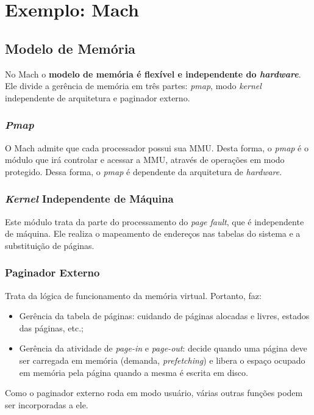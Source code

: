 \section{Exemplo: Mach}

\subsection{Modelo de Memória}
No Mach o \textbf{modelo de memória é flexível e independente do \textit{hardware}}. Ele divide a gerência de memória em três partes: \textit{pmap}, modo \textit{kernel} independente de arquitetura e paginador externo.

\subsubsection{\textit{Pmap}}
O Mach admite que cada processador possui sua MMU. Desta forma, o \textit{pmap} é o módulo que irá controlar e acessar a MMU, através de operações em modo protegido. Dessa forma, o \textit{pmap} é dependente da arquitetura de \textit{hardware}.

\subsubsection{\textit{Kernel} Independente de Máquina}
Este módulo trata da parte do processamento do \textit{page fault}, que é independente de máquina. Ele realiza o mapeamento de endereços nas tabelas do sistema e a substituição de páginas.

\subsubsection{Paginador Externo}
Trata da lógica de funcionamento da memória virtual. Portanto, faz:
\begin{itemize}
  \item Gerência da tabela de páginas: cuidando de páginas alocadas e livres, estados das páginas, etc.;

  \item Gerência da atividade de \textit{page-in} e \textit{page-out}: decide quando uma página deve ser carregada em memória (demanda, \textit{prefetching}) e libera o espaço ocupado em memória pela página quando a mesma é escrita em disco.
\end{itemize}

Como o paginador externo roda em modo usuário, várias outras funções podem ser incorporadas a ele.


